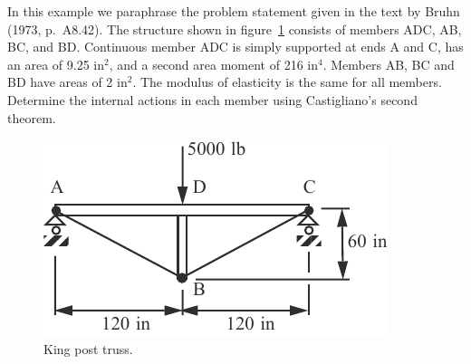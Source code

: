 \documentclass{AeroStructure-ERJohnson}
\begin{document}
\begin{example*}\label{ex6.9}In this example we paraphrase the problem statement given in the text by Bruhn (1973, p.~A8.42). The structure shown in figure~\ref{fig6.19} consists of members ADC, AB, BC, and BD. Continuous member ADC is simply supported at ends A and C, has an area of 9.25 in$^2$, and a second area moment of 216 in$^4$. Members AB, BC and BD have areas of 2 in$^2$. The modulus of elasticity is the same for all members. Determine the internal actions in each member using Castigliano's second theorem.
\vspace*{10pt}
\pagebreak

\begin{figure}
\vspace{-19pt}
\includegraphics{Figure_6-19.pdf}
\caption{King post truss. \label{fig6.19}}
\end{figure}



\end{example*}
\end{document}
